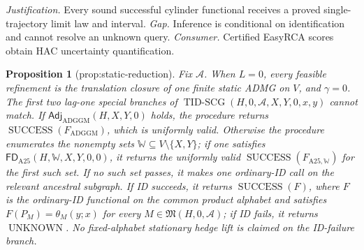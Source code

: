 \documentclass{article}
\newtheorem{proposition}{Proposition}
\begin{document}
\par\smallskip\noindent \textit{Justification.} Every sound successful cylinder functional receives a proved single-trajectory limit law and interval. \textit{Gap.} Inference is conditional on identification and cannot resolve an unknown query. \textit{Consumer.} Certified EasyRCA scores obtain HAC uncertainty quantification.

\begin{proposition}[prop:static-reduction]\label{prop:static-reduction}
Fix \(\mathcal A\).  When \(L=0\), every feasible refinement is the translation closure of one finite static ADMG on \(V\), and \(\gamma=0\).  The first two lag-one special branches of \(\operatorname{TID\text{-}SCG}(H,0,\mathcal A,X,Y,0,x,y)\) cannot match.  If \(\mathsf{Adj}_{\mathrm{ADGGM}}(H,X,Y,0)\) holds, the procedure returns \(\operatorname{SUCCESS}(F_{\mathrm{ADGGM}})\), which is uniformly valid.  Otherwise the procedure enumerates the nonempty sets \(\mathbb W\subseteq V\setminus\{X,Y\}\); if one satisfies \(\mathsf{FD}_{\mathrm{A25}}(H,\mathbb W,X,Y,0,0)\), it returns the uniformly valid \(\operatorname{SUCCESS}(F_{\mathrm{A25},\mathbb W})\) for the first such set.  If no such set passes, it makes one ordinary-ID call on the relevant ancestral subgraph.  If ID succeeds, it returns \(\operatorname{SUCCESS}(F)\), where \(F\) is the ordinary-ID functional on the common product alphabet and satisfies \(F(P_M)=\theta_M(y;x)\) for every \(M\in\mathfrak M(H,0,\mathcal A)\); if ID fails, it returns \(\operatorname{UNKNOWN}\).  No fixed-alphabet stationary hedge lift is claimed on the ID-failure branch.
\end{proposition}
\end{document}
